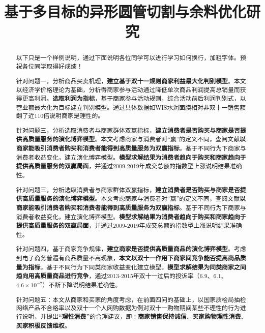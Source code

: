 \documentclass[UTF8]{ctexart}
\title{\textbf{基于多目标的异形圆管切割与余料优化研究}}%
\date{}%
\author{}%
\providecommand{\sihao}{}
\providecommand{\xiaosihao}{}
\begin{document}
\setcounter{page}{1}%
\maketitle
\vspace{-0.95cm}
\thispagestyle{fancy}   
\fancyhf{} %
\renewcommand{\headrulewidth}{0pt} %
\renewcommand{\abstractname}{\sihao 摘\quad 要} %
\begin{abstract}\xiaosihao
	\vspace{0.1cm}
	以下只是一个样例说明，通过下面说明各位同学可以进行学习如何换行，加粗字体。预祝各位同学取得好成绩！\par
	针对问题一，分析商品买卖机理，\textbf{建立基于双十一规则商家利益最大化判别模型}。本文以经济学价格理论为基础，分析得商家参与活动通过降低单次商品利润提高总销量而获得更高利润。\textbf{选取利润为指标}，基于商家参与活动规则，综合活动前后利润判别式，以营业额最大化为目标建立判别模型。通过具体数据如WIS水润面膜相对非双十一销售额翻了近110倍说明商家是理性的。\par
	针对问题三，分析选取消费者与商家群体双赢指标，\textbf{建立消费者是否购买与商家是否提供高质量服务的演化博弈模型}。本文考虑商家与消费者对“赢”的定义不同，查阅文献\textbf{以商家能吸引消费者购买和消费者能得到高质量服务为双赢指标}。基于不同行为下商家与消费者收益变化，建立演化博弈模型。\textbf{模型求解结果为消费者趋向于购买和商家趋向于提供高质量服务的双赢局面}，并通过2009-2019年成交总额的指数型上涨说明结果准确性。\par
		针对问题三，分析选取消费者与商家群体双赢指标，\textbf{建立消费者是否购买与商家是否提供高质量服务的演化博弈模型}。本文考虑商家与消费者对“赢”的定义不同，查阅文献\textbf{以商家能吸引消费者购买和消费者能得到高质量服务为双赢指标}。基于不同行为下商家与消费者收益变化，建立演化博弈模型。\textbf{模型求解结果为消费者趋向于购买和商家趋向于提供高质量服务的双赢局面}，并通过2009-2019年成交总额的指数型上涨说明结果准确性。\par
	针对问题四，基于商家竞争规律，\textbf{建立商家是否提供高质量商品的演化博弈模型}。考虑到电子商务普遍有商品质量不高现象，\textbf{本文以双十一作用下商家间竞争能否提高商品质量为指标}。基于不同行为下同类商家收益变化建立模型。\textbf{模型求解结果为同类商家之间趋向用高质量商品进行竞争}，通过2013-2015年双十一过后的投诉率（$6.9$、$6.1$、$4.6\times10^{-7}$）不断下降说明结果准确性。\par
	针对问题五：本文从商家和买家的角度考虑，在前面四问的基础上，以国家质检局抽检网络产品不合格率以及双十一个人网购数据为例对双十一购物期间某些不理性的行为进行说明，并提出\textbf{“理性消费”}的合理建议，即：\textbf{商家销售保持诚信}、\textbf{买家购物理性消费}、\textbf{买家积极反馈维权}。
	\\
	

\end{abstract}
\end{document}
